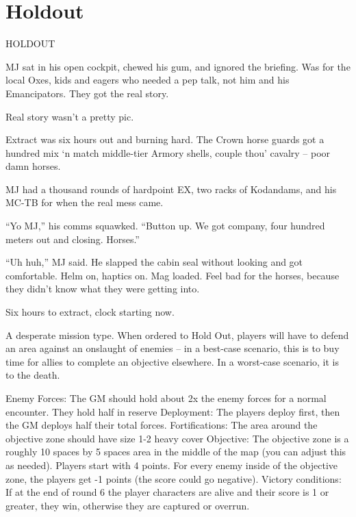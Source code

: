                                                                                                           
\section{Holdout}

HOLDOUT  

          MJ sat in his open cockpit, chewed his gum, and ignored the briefing. Was for the local Oxes, kids  
          and eagers who needed a pep talk, not him and his Emancipators. They got the real story.   

          Real story wasn’t a pretty pic.     

          Extract was six hours out and burning hard. The Crown horse guards got a hundred mix ‘n match  
          middle-tier Armory shells, couple thou’ cavalry -- poor damn horses.   

          MJ had a thousand rounds of hardpoint EX, two racks of Kodandams, and his MC-TB for when the  
          real mess came.  

          “Yo MJ,” his comms squawked. “Button up. We got company, four hundred meters out and closing.  
          Horses.”   

          “Uh huh,” MJ said. He slapped the cabin seal without looking and got comfortable. Helm on, haptics  
          on. Mag loaded. Feel bad for the horses, because they didn’t know what they were getting into.   

          Six hours to extract, clock starting now.     

A desperate mission type. When ordered to Hold Out, players will have to defend an area against  
an onslaught of enemies -- in a best-case scenario, this is to buy time for allies to complete an  
objective elsewhere. In a worst-case scenario, it is to the death.   

                                                                                                                               


Enemy Forces: The GM should hold about 2x the enemy forces for a normal encounter. They  
hold half in reserve  
Deployment: The players deploy first, then the GM deploys half their total forces.  
Fortifications: The area around the objective zone should have size 1-2 heavy cover  
Objective: The objective zone is a roughly 10 spaces by 5 spaces area in the middle of the map  
(you can adjust this as needed). Players start with 4 points. For every enemy inside of the  
objective zone, the players get -1 points (the score could go negative).  
Victory conditions:  If at the end of round 6 the player characters are alive and their score is 1 or  
greater, they win, otherwise they are captured or overrun.  

